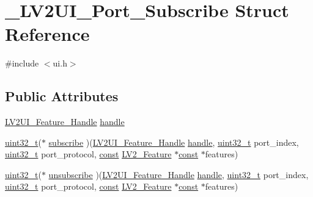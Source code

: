 \hypertarget{struct___l_v2_u_i___port___subscribe}{}\section{\+\_\+\+L\+V2\+U\+I\+\_\+\+Port\+\_\+\+Subscribe Struct Reference}
\label{struct___l_v2_u_i___port___subscribe}


{\ttfamily \#include $<$ui.\+h$>$}

\subsection*{Public Attributes}
\begin{DoxyCompactItemize}
\item 
\hyperlink{ui_8h_aee1f066da7d217c82bafa46bccbfde94}{L\+V2\+U\+I\+\_\+\+Feature\+\_\+\+Handle} \hyperlink{struct___l_v2_u_i___port___subscribe_a0028423b1b8309a518b5c1ac638920bc}{handle}
\item 
\hyperlink{lib-src_2ffmpeg_2win32_2stdint_8h_a6eb1e68cc391dd753bc8ce896dbb8315}{uint32\+\_\+t}($\ast$ \hyperlink{struct___l_v2_u_i___port___subscribe_a06151d1866ab7e657434c69cf6e8b471}{subscribe} )(\hyperlink{ui_8h_aee1f066da7d217c82bafa46bccbfde94}{L\+V2\+U\+I\+\_\+\+Feature\+\_\+\+Handle} \hyperlink{struct___l_v2_u_i___port___subscribe_a0028423b1b8309a518b5c1ac638920bc}{handle}, \hyperlink{lib-src_2ffmpeg_2win32_2stdint_8h_a6eb1e68cc391dd753bc8ce896dbb8315}{uint32\+\_\+t} port\+\_\+index, \hyperlink{lib-src_2ffmpeg_2win32_2stdint_8h_a6eb1e68cc391dd753bc8ce896dbb8315}{uint32\+\_\+t} port\+\_\+protocol, \hyperlink{getopt1_8c_a2c212835823e3c54a8ab6d95c652660e}{const} \hyperlink{lv2_8h_a78d13b607443404459db283371723234}{L\+V2\+\_\+\+Feature} $\ast$\hyperlink{getopt1_8c_a2c212835823e3c54a8ab6d95c652660e}{const} $\ast$features)
\item 
\hyperlink{lib-src_2ffmpeg_2win32_2stdint_8h_a6eb1e68cc391dd753bc8ce896dbb8315}{uint32\+\_\+t}($\ast$ \hyperlink{struct___l_v2_u_i___port___subscribe_a82e2510deaba2a0b9e6039e0a84db538}{unsubscribe} )(\hyperlink{ui_8h_aee1f066da7d217c82bafa46bccbfde94}{L\+V2\+U\+I\+\_\+\+Feature\+\_\+\+Handle} \hyperlink{struct___l_v2_u_i___port___subscribe_a0028423b1b8309a518b5c1ac638920bc}{handle}, \hyperlink{lib-src_2ffmpeg_2win32_2stdint_8h_a6eb1e68cc391dd753bc8ce896dbb8315}{uint32\+\_\+t} port\+\_\+index, \hyperlink{lib-src_2ffmpeg_2win32_2stdint_8h_a6eb1e68cc391dd753bc8ce896dbb8315}{uint32\+\_\+t} port\+\_\+protocol, \hyperlink{getopt1_8c_a2c212835823e3c54a8ab6d95c652660e}{const} \hyperlink{lv2_8h_a78d13b607443404459db283371723234}{L\+V2\+\_\+\+Feature} $\ast$\hyperlink{getopt1_8c_a2c212835823e3c54a8ab6d95c652660e}{const} $\ast$features)
\end{DoxyCompactItemize}


